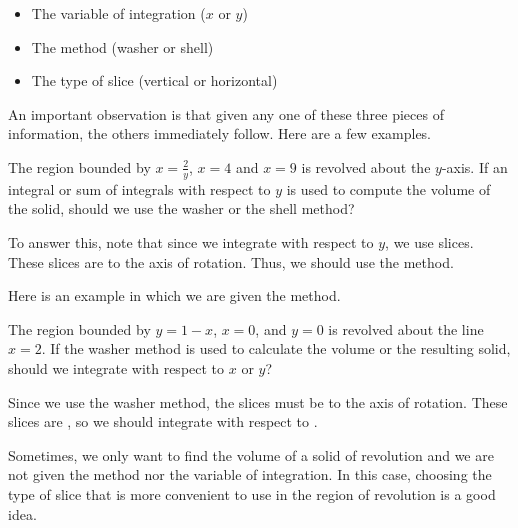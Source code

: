\documentclass{ximera}
\begin{document}
\begin{itemize}
\item The variable of integration ($x$ or $y$)
\item The method (washer or shell)
\item The type of slice (vertical or horizontal)
\end{itemize}

An important observation is that given any one of these three pieces of information, the others immediately follow.  Here are a few examples.

\begin{example}
The region bounded by $x=\frac{2}{y}$, $x=4$ and $x=9$ is revolved about the $y$-axis.  If an integral or sum of integrals with respect to $y$ is used to compute the volume of the solid, should we use the washer or the shell method?

\begin{explanation}  To answer this, note that since we integrate with respect to $y$, we use  slices.  These slices are  to the axis of rotation.  Thus, we should use the  method.
\end{explanation}
\end{example}

Here is an example in which we are given the method. 

\begin{example}
The region bounded by $y=1-x$, $x=0$, and $y=0$ is revolved about the line $x=2$.  If the washer method is used to calculate the volume or the resulting solid, should we integrate with respect to $x$ or $y$?  

\begin{explanation}
Since we use the washer method, the slices must be  to the axis of rotation. These slices are , so we should integrate with respect to .

\end{explanation}
\end{example}

Sometimes, we only want to find the volume of a solid of revolution and we are not given the method nor the variable of integration.  In this case, choosing the type of slice that is more convenient to use in the region of revolution is a good idea.
\end{document}
